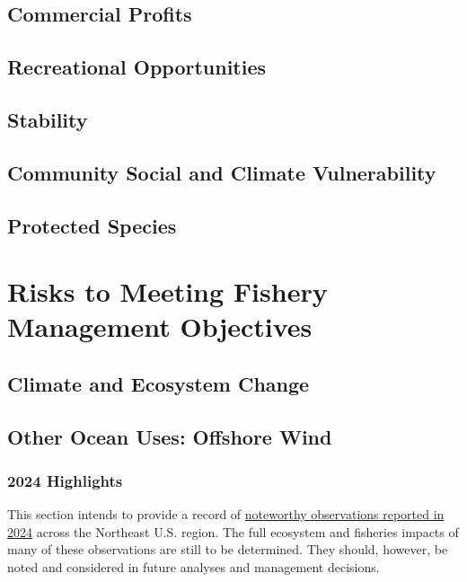 \documentclass[
  10pt,
]{article}
\begin{document}
\subsection{Commercial Profits}\label{commercial-profits}

\subsection{Recreational Opportunities}\label{recreational-opportunities}

\subsection{Stability}\label{stability}

\subsection{Community Social and Climate Vulnerability}\label{community-social-and-climate-vulnerability}

\subsection{Protected Species}\label{protected-species}

\section{Risks to Meeting Fishery Management Objectives}\label{risks-to-meeting-fishery-management-objectives}

\subsection{Climate and Ecosystem Change}\label{climate-and-ecosystem-change}

\subsection{Other Ocean Uses: Offshore Wind}\label{other-ocean-uses-offshore-wind}

\newpage

\subsubsection{2024 Highlights}\label{highlights}

This section intends to provide a record of \href{https://noaa-edab.github.io/catalog/observation_synthesis_2024.html}{noteworthy observations reported in 2024} across the Northeast U.S. region. The full ecosystem and fisheries impacts of many of these observations are still to be determined. They should, however, be noted and considered in future analyses and management decisions.
\end{document}
